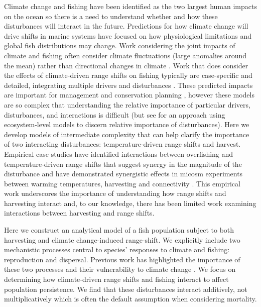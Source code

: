 \documentclass[12pt,english]{article}
\begin{document}
\begin{spacing}{1.9}
\begin{flushleft}
Climate change and fishing have been identified as the two largest human impacts on the ocean \citep{Halpernetal2008} so there is a need to understand whether and how these disturbances will interact in the future. Predictions for how climate change will drive shifts in marine systems have focused on how physiological limitations \citep{PortnerKnust2007} and global fish distributions \citep{Cheungetal2008, Cheungetal2009, Hareetal2010, Lenoiretal2011} may change. Work considering the joint impacts of climate and fishing often consider climate fluctuations (large anomalies around the mean) rather than directional changes in climate \citep{WaltersParma1996, KingMcFarlane2006}. Work that does consider the effects of climate-driven range shifts on fishing typically are case-specific and detailed, integrating multiple drivers and disturbances \citep{Cheungetal2010, Lindegrenetal2010, Brownetal2010, Merinoetal2010, Merinoetal2010b, Plaganyietal2011, Ainsworthetal2011, Zhangetal2011, Barangeetal2011, Howardetal2013}. These predicted impacts are important for management and conservation planning \citep{Allisonetal2009}, however these models are so complex that understanding the relative importance of particular drivers, disturbances, and interactions is difficult (but see \citet{Nyeetal2013} for an approach using ecosystem-level models to discern relative importance of disturbances). Here we develop models of intermediate complexity \citep[sensu][]{Gaylordetal2005} that can help clarify the importance of two interacting disturbances: temperature-driven range shifts and harvest. Empirical case studies have identified interactions between overfishing and temperature-driven range shifts that suggest synergy in the magnitude of the disturbance \citep{Lingetal2009} and have demonstrated synergistic effects in micosm experiments between warming temperatures, harvesting and connectivity \citep{Moraetal2007}. This empirical work underscores the importance of understanding how range shifts and harvesting interact and, to our knowledge, there has been limited work examining interactions between harvesting and range shifts.

Here we construct an analytical model of a fish population subject to both harvesting and climate change-induced range-shift. We explicitly include two mechanistic processes central to species' responses to climate and fishing: reproduction and dispersal. Previous work has highlighted the importance of these two processes and their vulnerability to climate change \citep{Fordhametal2013, Hastingsetal2005}. We focus on determining how climate-driven range shifts and fishing interact to affect population persistence. We find that these disturbances interact additively, not multiplicatively which is often the default assumption when considering mortality. 


\end{flushleft}
\end{spacing}
\end{document}
